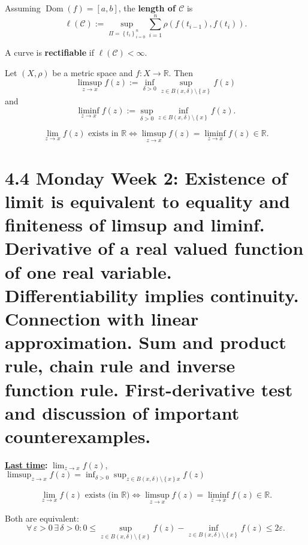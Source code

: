 \documentclass{notes}
\begin{document}
\begin{defn}
  Assuming $\operatorname{Dom}(f) = [a, b]$, the {\boldmath \bfseries length of $\mathcal C$} is 
  \[
    \ell(\mathcal C) := \sup_{\Pi = \left \{ t_i \right \}_{i = 0}^n} \sum_{i = 1}^n \rho(f(t_{i - 1}), f(t_i)).
  \]
\end{defn}

\begin{defn}
  A curve is {\boldmath \bfseries rectifiable} if $\ell(\mathcal C) < \infty$.
\end{defn}

\begin{defn}
  Let $(X, \rho)$ be a metric space and $f \colon X \to \mathbb R$.
  Then 
  \[
    \limsup_{z \to x} f(z) := \inf_{\delta > 0} \sup_{z \in B(x, \delta) \setminus \left \{ x \right \}} f(z)
  \]
  and 
  \[
    \liminf_{z \to x} f(z) := \sup_{\delta > 0} \inf_{z \in B(x, \delta) \setminus \left \{ x \right \}} f(z).
  \]
\end{defn}

\begin{lem}
  \[
    \lim_{z \to x} f(z) \text{ exists in $\mathbb R$} \Leftrightarrow \limsup_{z \to x} f(z) = \liminf_{z \to x} f(z) \in \mathbb R.
  \]
\end{lem}

\newpage

\section{4.4 Monday Week 2: Existence of limit is equivalent to equality and finiteness of limsup and liminf. Derivative of a real valued function of one real variable. Differentiability implies continuity. Connection with linear approximation. Sum and product rule, chain rule and inverse function rule. First-derivative test and discussion of important counterexamples.}

{\boldmath \bfseries \underline{Last time}:} $\lim_{z \to x} f(z)$, $\limsup_{z \to x} f(z) = \inf_{\delta > 0} \sup_{z \in B(x, \delta) \setminus \left \{ x \right \}x} f(z)$

\begin{lem}
  \[
    \lim_{z \to x} f(z) \text{ exists (in $\mathbb R$)} \Leftrightarrow \limsup_{z \to x} f(z) = \liminf_{z \to x} f(z) \in \mathbb R.
  \]
\end{lem}

\begin{prf}
  Both are equivalent: 
  \[
    \forall \, \varepsilon > 0 \, \exists \, \delta > 0: 0 \leq \sup_{z \in B(x, \delta) \setminus \left \{ x \right \}} f(z) - \inf_{z \in B(x, \delta) \setminus \left \{ x \right \}} f(z) \leq 2 \varepsilon.
  \]
\end{prf}
\end{document}
